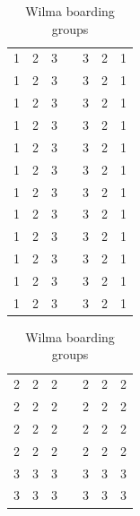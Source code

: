 \documentclass[english]{article}
\begin{document}
\begin{table}[H]
    \begin{subtable}[h]{0.45\textwidth}
        \centering
        \begin{tabular}{|c|c|c|c|c|c|c|}
        \hline
        \rowcolor{lightgray}\multicolumn{7}{|c|}{front}\\
        \hline
        1 & 2 & 3 & \cellcolor{lightgray} & 3 & 2 & 1 \\
        1 & 2 & 3 & \cellcolor{lightgray} & 3 & 2 & 1 \\
        1 & 2 & 3 & \cellcolor{lightgray} & 3 & 2 & 1 \\
        1 & 2 & 3 & \cellcolor{lightgray} & 3 & 2 & 1 \\
        1 & 2 & 3 & \cellcolor{lightgray} & 3 & 2 & 1 \\
        1 & 2 & 3 & \cellcolor{lightgray} & 3 & 2 & 1 \\
        1 & 2 & 3 & \cellcolor{lightgray} & 3 & 2 & 1 \\
        1 & 2 & 3 & \cellcolor{lightgray} & 3 & 2 & 1 \\
        1 & 2 & 3 & \cellcolor{lightgray} & 3 & 2 & 1 \\
        1 & 2 & 3 & \cellcolor{lightgray} & 3 & 2 & 1 \\
        1 & 2 & 3 & \cellcolor{lightgray} & 3 & 2 & 1 \\
        1 & 2 & 3 & \cellcolor{lightgray} & 3 & 2 & 1 \\
        \hline
        \end{tabular}
       \caption{Wilma boarding groups}
       \label{tab:wilma_group}
    \end{subtable}
    \hfill
    \begin{subtable}[h]{0.45\textwidth}
        \centering
        \begin{tabular}{|c c c|c|c c c|}
    \hline
    \rowcolor{lightgray}\multicolumn{7}{|c|}{front}\\
    \hline
        2 & 2 & 2 & \cellcolor{lightgray} & 2 & 2 & 2 \\
        2 & 2 & 2 & \cellcolor{lightgray} & 2 & 2 & 2 \\
        2 & 2 & 2 & \cellcolor{lightgray} & 2 & 2 & 2 \\
        2 & 2 & 2 & \cellcolor{lightgray} & 2 & 2 & 2 \\
        \hline
        3 & 3 & 3 & \cellcolor{lightgray} & 3 & 3 & 3 \\
        3 & 3 & 3 & \cellcolor{lightgray} & 3 & 3 & 3 \\

\end{tabular}
\end{subtable}
\end{table}
\end{document}
